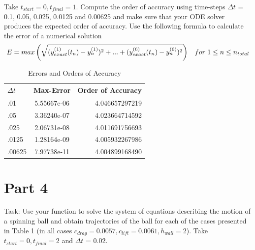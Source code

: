 \documentclass[12pt]{article}
\begin{document}
Take $t_{start} = 0, t_{final} = 1$. Compute the order of accuracy using time-steps $\Delta t$ = 0.1, 0.05, 0.025, 0.0125 and 0.00625 and make sure that your ODE solver produces the expected order of accuracy. Use the following formula to calculate the error of a numerical solution\\
\begin{equation*}
E = max\left(\sqrt{(y_{exact}^{(1)}(t_{n}) - y_{n}^{(1)})^{2} + ... + (y_{exact}^{(6)}(t_{n}) - y_{n}^{(6)})^{2}}\right)\hspace{.3cm}for \hspace{.1cm}1\leq n \leq n_{total}
\end{equation*}

\begin{table}[]
\centering
\label{my-label}
\begin{tabular}{| l | c | r | }
\hline
$\Delta t$ & Max-Error   & Order of Accuracy \\ \hline
.01       & 5.55667e-06 & 4.046657297219    \\ \hline
.05       & 3.36240e-07 & 4.023664714592    \\ \hline
.025      & 2.06731e-08 & 4.011691756693    \\ \hline
.0125     & 1.28164e-09 & 4.005932267986    \\ \hline
.00625    & 7.97738e-11 & 4.004899168490    \\ \hline
\end{tabular}
\caption{Errors and Orders of Accuracy}
\end{table}
\newpage
\clearpage
\section*{Part 4}\label{sec::Part 4}
\noindent Task: Use your function to solve the system of equations describing the motion of a spinning ball and obtain trajectories of the ball for each of the cases presented in Table 1 (in all cases $c_{drag} = 0.0057, c_{lift} = 0.0061, h_{wall} = 2$). Take $t_{start} = 0, t_{final} = 2$ and $\Delta t$ = 0.02.\\
\end{document}
